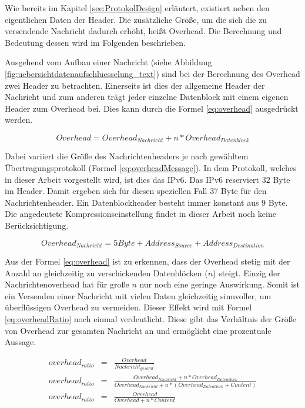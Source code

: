 Wie bereits im Kapitel \ref{sec:ProtokolDesign} erläutert, existiert neben den
eigentlichen Daten der Header. Die zusätzliche Größe, um die sich die
zu versendende Nachricht dadurch erhöht, heißt Overhead. Die Berechnung und
Bedeutung dessen wird im Folgenden beschrieben.

Ausgehend vom Aufbau einer Nachricht (siehe Abbildung
\ref{fig:uebersichtdatenaufschluesselung_text}) sind bei der Berechnung des
Overhead zwei Header zu betrachten. Einerseits ist dies der allgemeine Header der
Nachricht und zum anderen trägt jeder einzelne Datenblock
mit einem eigenen Header zum Overhead bei. Dies kann durch die Formel
\ref{eq:overhead} ausgedrückt werden.

\begin{equation}
	Overhead = Overhead_{Nachricht} + n * Overhead_{Datenblock}
	\label{eq:overhead}
\end{equation}

Dabei variiert die Größe des Nachrichtenheaders je nach gewähltem
Übertragungsprotokoll (Formel \ref{eq:overheadMessage}). In dem Protokoll,
welches in dieser Arbeit vorgestellt wird, ist dies das IPv6. Das IPv6
reserviert $32$ Byte im Header. Damit ergeben sich für diesen speziellen
Fall $37$ Byte für den Nachrichtenheader. Ein Datenblockheader besteht immer
konstant aus $9$ Byte.
Die angedeutete Kompressionseinstellung findet in dieser Arbeit noch
keine Berücksichtigung.

\begin{equation}
	Overhead_{Nachricht} = 5 Byte + Address_{Source} + Address_{Destination}
	\label{eq:overheadMessage}
\end{equation}

Aus der Formel \ref{eq:overhead} ist zu erkennen, dass der Overhead
stetig mit der Anzahl an gleichzeitig zu verschickenden Datenblöcken ($n$)
steigt. Einzig der Nachrichtenoverhead hat für große $n$ nur noch eine
geringe Auswirkung. Somit ist ein Versenden einer Nachricht mit vielen Daten
gleichzeitig sinnvoller, um überflüssigen Overhead zu vermeiden. Dieser
Effekt wird mit Formel \ref{eq:overheadRatio} noch einmal verdeutlicht. Diese
gibt das Verhältnis der Größe von Overhead zur gesamten Nachricht an und
ermöglicht eine prozentuale Aussage.

\begin{eqnarray} 
	overhead_{ratio} & = & \frac{Overhead}{Nachricht_{gesamt}}\\
	overhead_{ratio} & = & \frac{Overhead_{Nachricht} + n * Overhead_{Datenblock}}{Overhead_{Nachricht} + n * (Overhead_{Datenblock} + Content)}\\
	overhead_{ratio} & = & \frac{Overhead}{Overhead + n * Content}
	\label{eq:overheadRatio}
\end{eqnarray}

